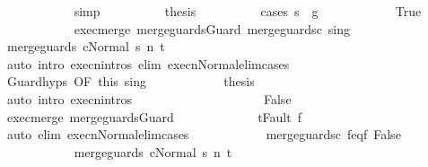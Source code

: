 \begin{isabellebody}
\ \ \ \ \ \ \ \ \ \ \isamarkupfalse%
\ simp\isanewline
\ \ \ \ \ \ \ \ \isamarkupfalse%
\ {\isacharquery}thesis\isanewline
\ \ \ \ \ \ \ \ \isamarkupfalse%
\ {\isacharparenleft}cases\ {\isachardoublequoteopen}s\ {\isasymin}\ g{\isacharprime}{\isachardoublequoteclose}{\isacharparenright}\isanewline
\ \ \ \ \ \ \ \ \ \ \isamarkupfalse%
\ True\isanewline
\ \ \ \ \ \ \ \ \ \ \isamarkupfalse%
\ exec{\isacharunderscore}merge\ merge{\isacharunderscore}guards{\isacharunderscore}Guard\ merge{\isacharunderscore}guards{\isacharunderscore}c\ s{\isacharunderscore}in{\isacharunderscore}g\isanewline
\ \ \ \ \ \ \ \ \ \ \isamarkupfalse%
\ {\isachardoublequoteopen}{\isasymGamma}{\isasymturnstile}{\isasymlangle}merge{\isacharunderscore}guards\ c{\isacharcomma}Normal\ s{\isasymrangle}\ {\isacharequal}n{\isasymRightarrow}\ t{\isachardoublequoteclose}\isanewline
\ \ \ \ \ \ \ \ \ \ \ \ \isamarkupfalse%
\ {\isacharparenleft}auto\ intro{\isacharcolon}\ execn{\isachardot}intros\ elim{\isacharcolon}\ execn{\isacharunderscore}Normal{\isacharunderscore}elim{\isacharunderscore}cases{\isacharparenright}\isanewline
\ \ \ \ \ \ \ \ \ \ \isamarkupfalse%
\ Guard{\isachardot}hyps\ {\isacharbrackleft}OF\ this{\isacharbrackright}\ s{\isacharunderscore}in{\isacharunderscore}g\isanewline
\ \ \ \ \ \ \ \ \ \ \isamarkupfalse%
\ {\isacharquery}thesis\isanewline
\ \ \ \ \ \ \ \ \ \ \ \ \isamarkupfalse%
\ {\isacharparenleft}auto\ intro{\isacharcolon}\ execn{\isachardot}intros{\isacharparenright}\isanewline
\ \ \ \ \ \ \ \ \isamarkupfalse%
\isanewline
\ \ \ \ \ \ \ \ \ \ \isamarkupfalse%
\ False\isanewline
\ \ \ \ \ \ \ \ \ \ \isamarkupfalse%
\ exec{\isacharunderscore}merge\ merge{\isacharunderscore}guards{\isacharunderscore}Guard\ \isanewline
\ \ \ \ \ \ \ \ \ \ \isamarkupfalse%
\ {\isachardoublequoteopen}t{\isacharequal}Fault\ f{\isachardoublequoteclose}\isanewline
\ \ \ \ \ \ \ \ \ \ \ \ \isamarkupfalse%
\ {\isacharparenleft}auto\ elim{\isacharcolon}\ execn{\isacharunderscore}Normal{\isacharunderscore}elim{\isacharunderscore}cases{\isacharparenright}\isanewline
\ \ \ \ \ \ \ \ \ \ \isamarkupfalse%
\ merge{\isacharunderscore}guards{\isacharunderscore}c\ f{\isacharunderscore}eq{\isacharunderscore}f{\isacharprime}\ False\isanewline
\ \ \ \ \ \ \ \ \ \ \isamarkupfalse%
\ {\isachardoublequoteopen}{\isasymGamma}{\isasymturnstile}{\isasymlangle}merge{\isacharunderscore}guards\ c{\isacharcomma}Normal\ s{\isasymrangle}\ {\isacharequal}n{\isasymRightarrow}\ t{\isachardoublequoteclose}\isanewline

\end{isabellebody}
